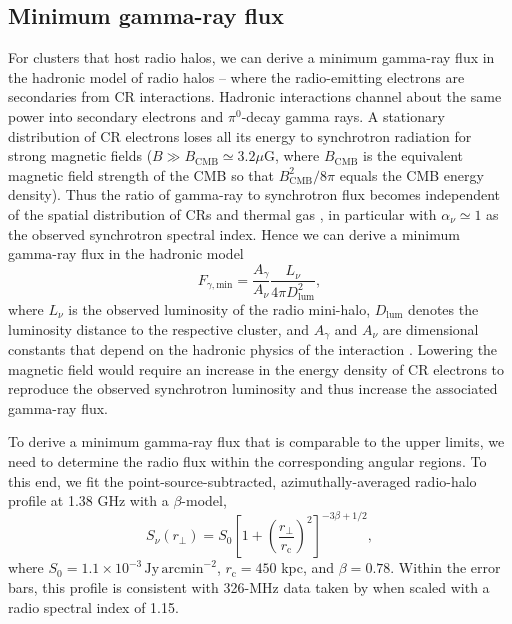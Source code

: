 \documentclass[12pt,manuscript]{aastex}
\newcommand{\rmn}{\mathrm}
\newcommand{\dps}{\displaystyle}
\begin{document}
%
%

\subsection{Minimum gamma-ray flux}
\label{sec:Fmin}

For clusters that host radio halos, we can derive a minimum gamma-ray flux in the hadronic model of
radio halos -- where the radio-emitting electrons are secondaries from CR interactions.  Hadronic
interactions channel about the same power into secondary electrons and $\pi^{0}$-decay gamma rays. A
stationary distribution of CR electrons loses all its energy to synchrotron radiation for strong
magnetic fields ($B \gg B_\rmn{CMB} \simeq 3.2 \mu$G, where $B_\rmn{CMB}$ is the equivalent magnetic
field strength of the CMB so that $B_\rmn{CMB}^2/8\pi$ equals the CMB energy density). Thus the
ratio of gamma-ray to synchrotron flux becomes independent of the spatial distribution of CRs and
thermal gas \citep{article:Voelk:1989, article:Pohl:1994, article:Pfrommer:2008}, in particular with
$\alpha_{\nu}\simeq 1$ as the observed synchrotron spectral index.  Hence we can derive a minimum
gamma-ray flux in the hadronic model
\begin{equation}
\label{eq:Fmin}
F_{\gamma,\rmn{min}} = \frac{\dps A_{\gamma}}{\dps A_{\nu}}\frac{\dps L_{\nu}}{\dps 4\pi D_{\rmn{lum}}^{2}},
\end{equation}
where $L_{\nu}$ is the observed luminosity of the radio mini-halo, $D_{\rmn{lum}}$ denotes the
luminosity distance to the respective cluster, and $A_\gamma$ and $A_\nu$ are dimensional constants
that depend on the hadronic physics of the interaction \citep{article:Pfrommer:2008,
Pfrommer_etal:2008}. Lowering the magnetic field would require an increase in the energy density of
CR electrons to reproduce the observed synchrotron luminosity and thus increase the associated
gamma-ray flux.

To derive a minimum gamma-ray flux that is comparable to the upper limits, we need to determine the
radio flux within the corresponding angular regions. To this end, we fit the
point-source-subtracted, azimuthally-averaged radio-halo profile at 1.38 GHz
\citep{article:Deiss_etal:1997} with a $\beta$-model,
\begin{equation}
\label{beta}
 S_{\nu} (r_{\bot})= S_{0} \left[ 1 + \left( \frac{r_{\bot}}{r_{\rmn{c}}}\right)^{2}\right]^{-3\beta + 1/2},
\end{equation}
where $S_{0} = 1.1 \times 10^{-3}\,\rmn{Jy\,arcmin}^{-2}$, $r_{\rmn{c}} = 450$ kpc, and
$\beta = 0.78$. Within the error bars, this profile is consistent with 326-MHz data taken by
\citet{article:Govoni_etal:2001} when scaled with a radio spectral index of 1.15.
\end{document}
